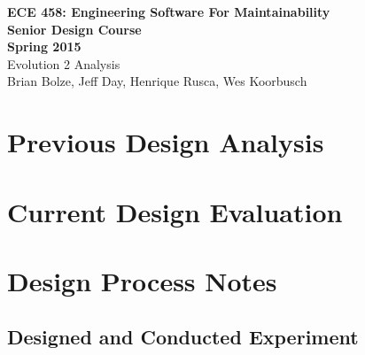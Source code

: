 \documentclass[11pt]{article}
\begin{document}
\begin{center}
\textbf{ECE 458: Engineering Software For Maintainability \\
Senior Design Course\\
Spring 2015\\[0.2in]}
Evolution 2 Analysis\\
Brian Bolze, Jeff Day, Henrique Rusca, Wes Koorbusch
\end{center}

\singlespacing
\tableofcontents





\pagebreak

\section{Previous Design Analysis}

\section{Current Design Evaluation}

\section{Design Process Notes}



\subsection{Designed and Conducted Experiment}
\end{document}
